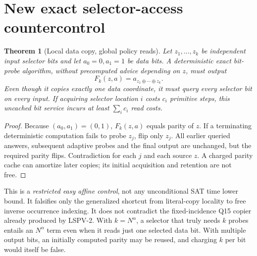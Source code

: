\documentclass[11pt]{article}
\newtheorem{theorem}{Theorem}
\begin{document}
\section{New exact selector-access countercontrol}
\begin{theorem}[Local data copy, global policy reads]
Let $z_1,\ldots,z_k$ be independent input selector bits and let $a_0=0,a_1=1$ be data bits. A deterministic exact bit-probe algorithm, without precomputed advice depending on $z$, must output
\[
 F_k(z,a)=a_{z_1\oplus\cdots\oplus z_k}.
\]
Even though it copies exactly one data coordinate, it must query \emph{every} selector bit on every input. If acquiring selector location $i$ costs $c_i$ primitive steps, this uncached bit service incurs at least $\sum_i c_i$ read costs.
\end{theorem}
\begin{proof}
Because $(a_0,a_1)=(0,1)$, $F_k(z,a)$ equals parity of $z$. If a terminating deterministic computation fails to probe $z_j$, flip only $z_j$. All earlier queried answers, subsequent adaptive probes and the final output are unchanged, but the required parity flips. Contradiction for each $j$ and each source $z$. A charged parity cache can amortize later copies; its initial acquisition and retention are not free.
\end{proof}
This is a \emph{restricted easy affine control}, not any unconditional SAT time lower bound. It falsifies only the generalized shortcut from literal-copy locality to free inverse occurrence indexing. It does not contradict the fixed-incidence Q15 copier already produced by LSPV-2. With $k=N^\alpha$, a selector that truly needs $k$ probes entails an $N^\alpha$ term even when it reads just one selected data bit. With multiple output bits, an initially computed parity may be reused, and charging $k$ per bit would itself be false.
\end{document}

